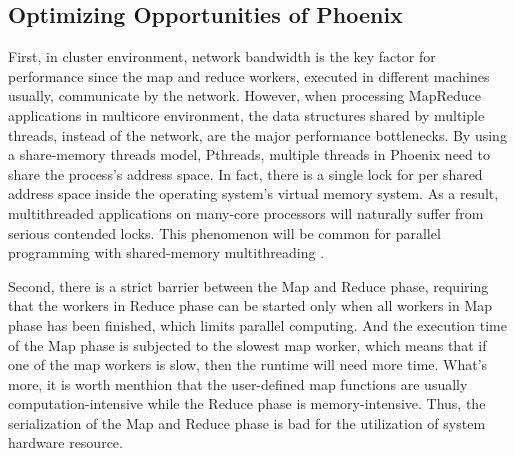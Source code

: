 



\subsection{Optimizing Opportunities of Phoenix }
First, in cluster environment, network bandwidth is the key factor for performance since the map and reduce workers, executed in different machines usually, communicate by the network.
However, when processing MapReduce applications in multicore environment, the data structures shared by multiple threads, instead of the network, are the major performance bottlenecks.
By using  a share-memory threads model, Pthreads, multiple threads in Phoenix need to share the process's address space\cite{linux}.
In fact, there is a single lock for per shared address space inside the operating system’s virtual memory system. 
As a result, multithreaded applications on many-core processors will naturally suffer from serious contended locks.
This phenomenon will be common for parallel programming with shared-memory multithreading \cite{clements2013radixvm}.


Second, there is a strict barrier between the Map and Reduce phase, requiring that the workers in Reduce phase can be started only when all workers in Map phase has been finished, 
which limits parallel computing.
And the execution time of the Map phase is subjected to the slowest map worker, which means that if one of the map workers is slow, then the runtime will need more time.
What's more, it is worth menthion that the user-defined map functions are usually computation-intensive while the Reduce phase is memory-intensive. Thus, the serialization of the Map and Reduce phase is bad for the utilization of system hardware resource.

